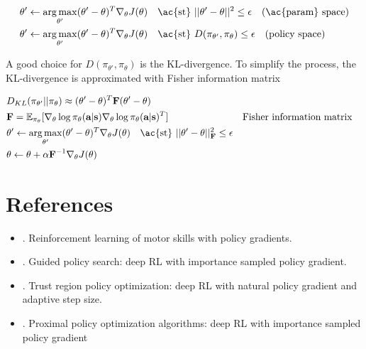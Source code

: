 \begin{align}
	&\theta' \leftarrow \underset{\theta'}{\arg\max} (\theta'-\theta)^T \nabla_\theta J(\theta) \quad \text{\ac{st} } ||\theta' - \theta||^2 \leq \epsilon \quad \text{(\ac{param} space)}\\
	&\theta' \leftarrow \underset{\theta'}{\arg\max} (\theta'-\theta)^T \nabla_\theta J(\theta) \quad \text{\ac{st} } D(\pi_{\theta'}, \pi_{\theta}) \leq \epsilon \quad \text{(policy space)}
\end{align}

A good choice for $D(\pi_{\theta'}, \pi_{\theta})$ is the \ac{KL}-divergence. To simplify the process, the \ac{KL}-divergence is approximated with Fisher information matrix

\begin{align}
	& D_{KL}(\pi_{\theta'} || \pi_{\theta}) \approx (\theta' - \theta)^T \textbf{F} (\theta' - \theta)\\
	& \textbf{F} = \mathbb{E}_{\pi_{\theta}} [ \nabla_\theta \log\pi_\theta(\textbf{a}|\textbf{s}) \nabla_\theta \log \pi_\theta (\textbf{a}|\textbf{s})^T ] && \text{Fisher information matrix}\\
	& \theta' \leftarrow \underset{\theta'}{\arg\max} (\theta'-\theta)^T \nabla_\theta J(\theta) \quad \text{\ac{st} } ||\theta' - \theta||^2_\textbf{F} \leq \epsilon\\
	& \theta \leftarrow \theta + \alpha \textbf{F}^{-1} \nabla_\theta J(\theta)
\end{align}

\section{References}
\begin{itemize}
	\item {}. Reinforcement learning of motor skills with policy gradients.
	\item {}. Guided policy search: deep \ac{RL} with importance sampled policy gradient.
	\item {}. Trust region policy optimization: deep \ac{RL} with natural policy gradient and adaptive step size.
	\item {}. Proximal policy optimization algorithms: deep \ac{RL} with importance sampled policy gradient
\end{itemize}